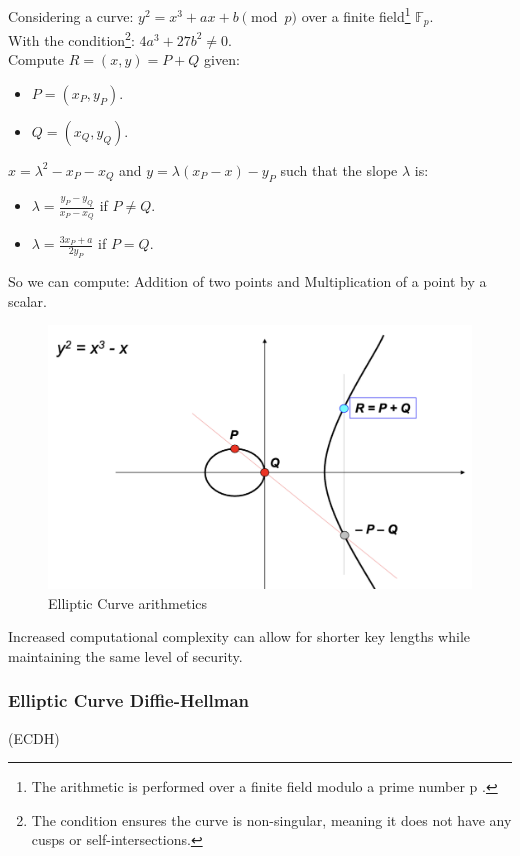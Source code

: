 Considering a curve: $y^2 = x^3 + ax + b \pmod{p}$ over a finite field\footnote{The arithmetic is performed over a finite field modulo a prime number  p .} $\mathbb{F}_p$.\\
With the condition\footnote{The condition ensures the curve is non-singular, meaning it does not have any cusps or self-intersections.}: $4a^3 + 27b^2 \neq 0$.\\
Compute $R=(x,y)=P+Q$ given:
\begin{itemize}
    \item $P=(x_P,y_P)$.
    \item $Q=(x_Q,y_Q)$.
\end{itemize}
$x= \lambda^2 - x_P - x_Q$ and $y= \lambda(x_P - x) - y_P$ such that the slope $\lambda$ is:
\begin{itemize}
    \item $\lambda = \frac{y_P - y_Q}{x_P - x_Q}$ if $P \neq Q$.
    \item $\lambda = \frac{3x_P + a}{2y_P}$ if $P = Q$.
\end{itemize}

\vspace{1cm}

So we can compute: Addition of two points and Multiplication of a point by a scalar.
\begin{figure}[H]
    \centering
    \includegraphics[width=0.5\linewidth]{Images/Cryptography/ec_arith.png}
    \caption{Elliptic Curve arithmetics}
\end{figure}

\begin{tcolorbox}[colback=blue!10!white, colframe=blue!50!white]
    Increased computational complexity can allow for shorter key lengths while maintaining the same level of security.
\end{tcolorbox}

\subsubsection{Elliptic Curve Diffie-Hellman}
\begin{center}
    (ECDH)
\end{center}


